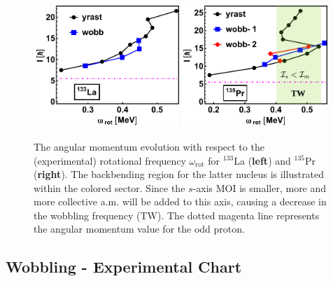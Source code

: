 \begin{figure}
    \begin{center}
        \includegraphics[width=0.49\textwidth]{Chapters/Figures/133La_wob-edited.pdf}
        \includegraphics[width=0.49\textwidth]{Chapters/Figures/135Pr_wob-edited.pdf}
        \caption{The angular momentum evolution with respect to the (experimental) rotational frequency $\omega_\text{rot}$ for $^{133}$La (\textbf{left}) and $^{135}$Pr (\textbf{right}). The backbending region for the latter nucleus is illustrated within the colored sector. Since the $s$-axis MOI is smaller, more and more collective a.m. will be added to this axis, causing a decrease in the wobbling frequency (TW). The dotted magenta line represents the angular momentum value for the odd proton.}
        \label{spin-vs-rotationalFreq-133-135}
    \end{center}
\end{figure}

\subsection{Wobbling - Experimental Chart}


